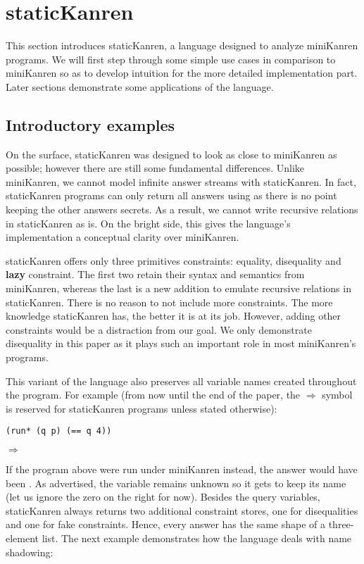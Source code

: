 \section{staticKanren}\label{static}
This section introduces staticKanren, a language designed to analyze miniKanren programs. We will first step through some simple use cases in comparison to miniKanren so as to develop intuition for the more detailed implementation part. Later sections demonstrate some applications of the language.

\subsection{Introductory examples}
On the surface, staticKanren was designed to look as close to miniKanren as possible; however there are still some fundamental differences. Unlike miniKanren, we cannot model infinite answer streams with staticKanren. In fact, staticKanren programs can only return all answers using  as there is no point keeping the other answers secrets. As a result, we cannot write recursive relations in staticKanren as is. On the bright side, this gives the language's implementation a conceptual clarity over miniKanren.

staticKanren offers only three primitives constraints: equality, disequality and \textbf{lazy} constraint. The first two retain their syntax and semantics from miniKanren, whereas the last is a new addition to emulate recursive relations in staticKanren. There is no reason to not include more constraints. The more knowledge staticKanren has, the better it is at its job. However, adding other constraints would be a distraction from our goal. We only demonstrate disequality in this paper as it plays such an important role in most miniKanren's programs.

This variant of the language also preserves all variable names created throughout the program. For example (from now until the end of the paper, the $\Rightarrow$ symbol is reserved for staticKanren programs unless stated otherwise):


\begin{lstlisting}
(run* (q p) (== q 4))
\end{lstlisting}
$\Rightarrow$ 

If the program above were run under miniKanren instead, the answer would have been . As advertised, the variable  remains unknown so it gets to keep its name (let us ignore the zero on the right for now). Besides the query variables, staticKanren always returns two additional constraint stores, one for disequalities and one for fake constraints. Hence, every answer has the same shape of a three-element list.  The next example demonstrates how the language deals with name shadowing:

